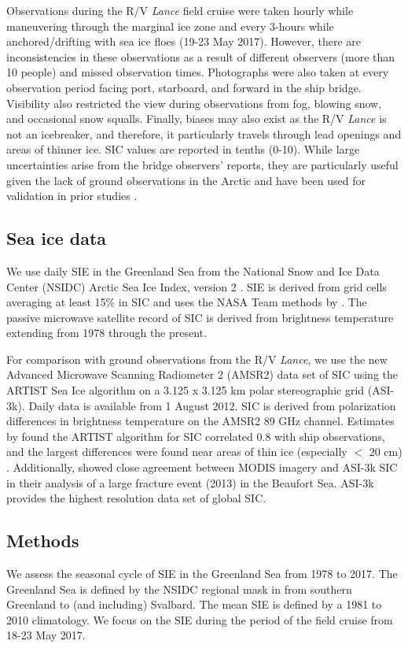 \documentclass[draft,linenumbers]{agujournal}
\begin{document}
Observations during the R/V \textit{Lance} field cruise were taken hourly while maneuvering through the marginal ice zone and every 3-hours while anchored/drifting with sea ice floes (19-23 May 2017). However, there are inconsistencies in these observations as a result of different observers (more than 10 people) and missed observation times. Photographs were also taken at every observation period facing port, starboard, and forward in the ship bridge. Visibility also restricted the view during observations from fog, blowing snow, and occasional snow squalls. Finally, biases may also exist as the R/V \textit{Lance} is not an icebreaker, and therefore, it particularly travels through lead openings and areas of thinner ice. SIC values are reported in tenths (0-10). While large uncertainties arise from the bridge observers' reports, they are particularly useful given the lack of ground observations in the Arctic and have been used for validation in prior studies \citep[e.g.,][]{Spreen2008}.

\subsection{Sea ice data}
\label{sec:2.2}
We use daily SIE in the Greenland Sea from the National Snow and Ice Data Center (NSIDC) Arctic Sea Ice Index, version 2 \citep{Fetterer2017}. SIE is derived from grid cells averaging at least 15\% in SIC and uses the NASA Team methods by \citet{Cavalieri1984}. The passive microwave satellite record of SIC is derived from brightness temperature extending from 1978 through the present.

For comparison with ground observations from the R/V \textit{Lance}, we use the new Advanced Microwave Scanning Radiometer 2 (AMSR2) data set of SIC \citep{Beitsch2014} using the ARTIST Sea Ice algorithm \citep{Spreen2008} on a 3.125 x 3.125 km polar stereographic grid (ASI-3k). Daily data is available from 1 August 2012. SIC is derived from polarization differences in brightness temperature on the AMSR2 89 GHz channel. Estimates by \citet{Spreen2008} found the ARTIST algorithm for SIC correlated 0.8 with ship observations, and the largest differences were found near areas of thin ice (especially $<$ 20 cm) \citep{Kern2003, Scott2015}. Additionally, \citet{Beitsch2014} showed close agreement between MODIS imagery and ASI-3k SIC in their analysis of a large fracture event (2013) in the Beaufort Sea. ASI-3k provides the highest resolution data set of global SIC. 

\subsection{Methods}
\label{sec:2.3}
We assess the seasonal cycle of SIE in the Greenland Sea from 1978 to 2017. The Greenland Sea is defined by the NSIDC regional mask in \citet{Parkinson1999a} from southern Greenland to (and including) Svalbard. The mean SIE is defined by a 1981 to 2010 climatology. We focus on the SIE during the period of the field cruise from 18-23 May 2017.
\end{document}
